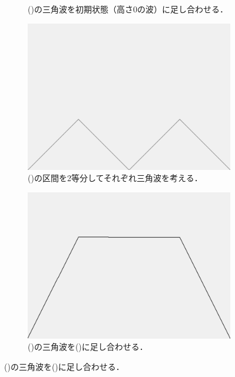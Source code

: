 \documentclass[dvipdfmx]{jsarticle}
\theoremstyle{definition}
\begin{document}
\begin{figure}[H]
\begin{subfigure}{0.24\textwidth}
        \caption{()の三角波を初期状態（高さ0の波）に足し合わせる．}
        \label{fig_proc_takagicurve1}
    \end{subfigure}
    \begin{subfigure}{0.24\textwidth}
        \centering
        \includegraphics[width=\textwidth]{figure/takagi/takagiwave2.png}
        \caption{()の区間を2等分してそれぞれ三角波を考える．}
        \label{fig_proc_takagiwave2}
    \end{subfigure}
    \begin{subfigure}{0.24\textwidth}
        \centering
        \includegraphics[width=\textwidth]{figure/takagi/takagicurve2.png}
        \caption{()の三角波を()に足し合わせる．}

\end{subfigure}
\end{figure}
\end{document}
